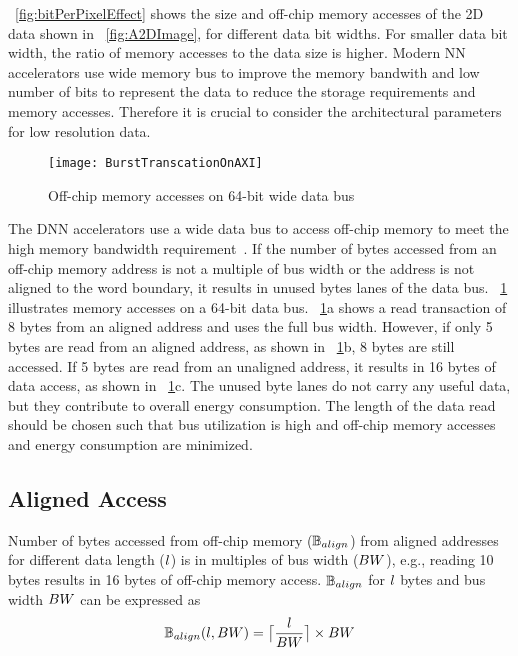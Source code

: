 \figurename{~\ref{fig:bitPerPixelEffect}} shows the size and off-chip memory accesses of the 2D data shown in  \figurename{~\ref{fig:A2DImage}}, for different data bit widths. For smaller data bit width, the ratio of memory accesses to the data size is higher. Modern NN accelerators use wide memory bus to improve the memory bandwith and low number of bits to represent the data to reduce the storage requirements and memory accesses. Therefore it is crucial to consider the architectural parameters for low resolution data.
\begin{figure}[!htb]
	\centering
	\captionsetup{font=sf}	
	\texttt{[image: BurstTranscationOnAXI]}
	\caption{Off-chip memory accesses on 64-bit wide data bus}
	\label{fig:AXI_AccesseOn64BitDataBus}
\end{figure}

The DNN accelerators use a wide data bus to access off-chip memory to meet the high memory bandwidth requirement~\cite{Chen2016EyerissAS,chen2014diannao}. If the number of bytes accessed from an off-chip memory address is not a multiple of bus width or the address is not aligned to the word boundary, it results in unused bytes lanes of the data bus. \figurename{~\ref{fig:AXI_AccesseOn64BitDataBus}} illustrates memory accesses on a 64-bit data bus. \figurename{~\ref{fig:AXI_AccesseOn64BitDataBus}a} shows a read transaction of 8 bytes from an aligned address and uses the full bus width. However, if only 5 bytes are read from an aligned address, as shown in \figurename{~\ref{fig:AXI_AccesseOn64BitDataBus}b}, 8 bytes are still accessed. If 5 bytes are read from an unaligned address, it results in 16 bytes of data access, as shown in \figurename{~\ref{fig:AXI_AccesseOn64BitDataBus}c}. The unused byte lanes do not carry any useful data, but they contribute to overall energy consumption. The length of the data read should be chosen such that bus utilization is high and off-chip memory accesses and energy consumption are minimized.

\subsection{Aligned Access}
Number of bytes accessed from off-chip memory ($\numBytesOffChip_{align}$) from aligned addresses for different data length ($\dataLength$) is in multiples of bus width ($\busWidth$), e.g., reading 10 bytes results in 16 bytes of off-chip memory access.  $\numBytesOffChip_{align}$ for $\dataLength$ bytes and bus width $\busWidth$ can be expressed as
\begin{align}\label{eq:alignedAccess}
	\begin{aligned}[b]
		\numBytesOffChip_{align}(\dataLength,\busWidth) = \ceil[\big]{\frac{\dataLength}{\busWidth}}\times {\busWidth}
	\end{aligned}
\end{align}
